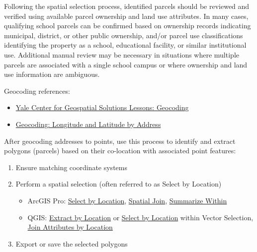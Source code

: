 \documentclass[
  letterpaper,
  DIV=11,
  numbers=noendperiod]{scrreprt}
\providecommand{\tightlist}{%
  \setlength{\itemsep}{0pt}\setlength{\parskip}{0pt}}
\begin{document}
Following the spatial selection process, identified parcels should be
reviewed and verified using available parcel ownership and land use
attributes. In many cases, qualifying school parcels can be confirmed
based on ownership records indicating municipal, district, or other
public ownership, and/or parcel use classifications identifying the
property as a school, educational facility, or similar institutional
use. Additional manual review may be necessary in situations where
multiple parcels are associated with a single school campus or where
ownership and land use information are ambiguous.

Geocoding references:

\begin{itemize}
\tightlist
\item
  \href{https://geospatial.yale.edu/tutorials-geocoding}{Yale Center for
  Geospatial Solutions Lessons: Geocoding}
\item
  \href{https://gisgeography.com/geocoding/}{Geocoding: Longitude and
  Latitude by Address}
\end{itemize}

After geocoding addresses to points, use this process to identify and
extract polygons (parcels) based on their co-location with associated
point features:

\begin{enumerate}
\def\labelenumi{\arabic{enumi}.}
\tightlist
\item
  Ensure matching coordinate systems
\item
  Perform a spatial selection (often referred to as Select by Location)

  \begin{itemize}
  \tightlist
  \item
    ArcGIS Pro:
    \href{https://doc.esri.com/en/arcgis-pro/latest/help/mapping/navigation/select-features-by-location.html}{Select
    by Location},
    \href{https://doc.esri.com/en/arcgis-pro/latest/tool-reference/analysis/spatial-join.html?tabs=dialog}{Spatial
    Join},
    \href{https://doc.esri.com/en/arcgis-pro/latest/tool-reference/analysis/summarize-within.html?tabs=dialog}{Summarize
    Within}
  \item
    QGIS:
    \href{https://docs.qgis.org/3.44/en/docs/user_manual/processing_algs/qgis/vectorselection.html\#extract-by-location}{Extract
    by Location} or
    \href{https://docs.qgis.org/3.44/en/docs/user_manual/processing_algs/qgis/vectorselection.html\#select-by-location}{Select
    by Location} within Vector Selection,
    \href{https://www.qgistutorials.com/en/docs/3/performing_spatial_joins.html}{Join
    Attributes by Location}
  \end{itemize}
\item
  Export or save the selected polygons
\end{enumerate}
\end{document}
